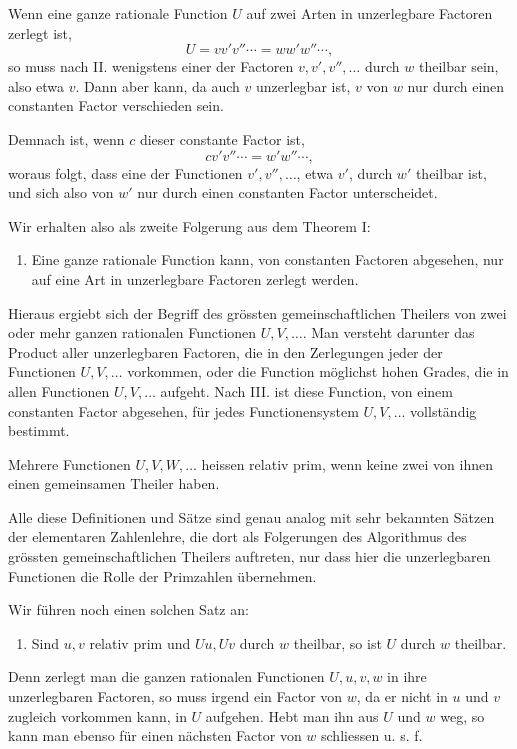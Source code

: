 \documentclass[11pt]{article}
\begin{document}
Wenn eine ganze rationale Function $U$ auf zwei Arten in unzerlegbare Factoren zerlegt ist,
\[
U=vv'v''\cdots=ww'w''\cdots,
\]
so muss nach II. wenigstens einer der Factoren $v,v',v'',\ldots$ durch $w$ theilbar sein, also etwa $v$. Dann aber kann, da auch $v$ unzerlegbar ist, $v$ von $w$ nur durch einen constanten Factor verschieden sein.

Demnach ist, wenn $c$ dieser constante Factor ist,
\[
cv'v''\cdots=w'w''\cdots,
\]
woraus folgt, dass eine der Functionen $v',v'',\ldots$, etwa $v'$, durch $w'$ theilbar ist, und sich also von $w'$ nur durch einen constanten Factor unterscheidet.

Wir erhalten also als zweite Folgerung aus dem Theorem I:

\begin{enumerate}[label=\Roman*.,leftmargin=2.4em,start=3]
\item Eine ganze rationale Function kann, von constanten Factoren abgesehen, nur auf eine Art in unzerlegbare Factoren zerlegt werden.
\end{enumerate}

Hieraus ergiebt sich der Begriff des grössten gemeinschaftlichen Theilers von zwei oder mehr ganzen rationalen Functionen $U,V,\ldots$. Man versteht darunter das Product aller unzerlegbaren Factoren, die in den Zerlegungen jeder der Functionen $U,V,\ldots$ vorkommen, oder die Function möglichst hohen Grades, die in allen Functionen $U,V,\ldots$ aufgeht. Nach III. ist diese Function, von einem constanten Factor abgesehen, für jedes Functionensystem $U,V,\ldots$ vollständig bestimmt.

Mehrere Functionen $U,V,W,\ldots$ heissen relativ prim, wenn keine zwei von ihnen einen gemeinsamen Theiler haben.

Alle diese Definitionen und Sätze sind genau analog mit sehr bekannten Sätzen der elementaren Zahlenlehre, die dort als Folgerungen des Algorithmus des grössten gemeinschaftlichen Theilers auftreten, nur dass hier die unzerlegbaren Functionen die Rolle der Primzahlen übernehmen.

Wir führen noch einen solchen Satz an:

\begin{enumerate}[label=\Roman*.,leftmargin=2.4em,start=4]
\item Sind $u,v$ relativ prim und $Uu,Uv$ durch $w$ theilbar, so ist $U$ durch $w$ theilbar.
\end{enumerate}

Denn zerlegt man die ganzen rationalen Functionen $U,u,v,w$ in ihre unzerlegbaren Factoren, so muss irgend ein Factor von $w$, da er nicht in $u$ und $v$ zugleich vorkommen kann, in $U$ aufgehen. Hebt man ihn aus $U$ und $w$ weg, so kann man ebenso für einen nächsten Factor von $w$ schliessen u. s. f.
\end{document}
